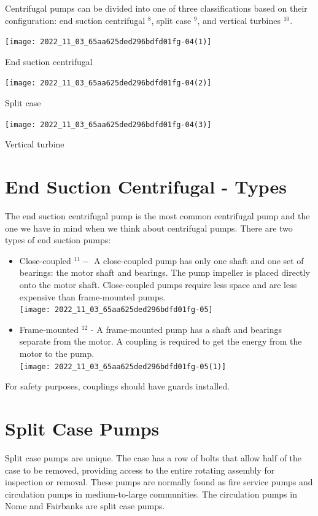 \documentclass[10pt]{article}
\begin{document}
Centrifugal pumps can be divided into one of three classifications based on their configuration: end suction centrifugal ${ }^{8}$, split case $^{9}$, and vertical turbines ${ }^{10}$.

\texttt{[image: 2022\_11\_03\_65aa625ded296bdfd01fg-04(1)]}

End suction centrifugal

\texttt{[image: 2022\_11\_03\_65aa625ded296bdfd01fg-04(2)]}

Split case

\texttt{[image: 2022\_11\_03\_65aa625ded296bdfd01fg-04(3)]}

Vertical turbine

\section{End Suction Centrifugal - Types}
The end suction centrifugal pump is the most common centrifugal pump and the one we have in mind when we think about centrifugal pumps. There are two types of end suction pumps:

\begin{itemize}
  \item Close-coupled ${ }^{11}-$ A close-coupled pump has only one shaft and one set of bearings: the motor shaft and bearings. The pump impeller is placed directly onto the motor shaft. Close-coupled pumps require less space and are less expensive than frame-mounted pumps.\\

\texttt{[image: 2022\_11\_03\_65aa625ded296bdfd01fg-05]}

  \item Frame-mounted ${ }^{12}$ - A frame-mounted pump has a shaft and bearings separate from the motor. A coupling is required to get the energy from the motor to the pump.\\

\texttt{[image: 2022\_11\_03\_65aa625ded296bdfd01fg-05(1)]}

\end{itemize}
For safety purposes, couplings should have guards installed.

\section{Split Case Pumps}
Split case pumps are unique. The case has a row of bolts that allow half of the case to be removed, providing access to the entire rotating assembly for inspection or removal. These pumps are normally found as fire service pumps and circulation pumps in medium-to-large communities. The circulation pumps in Nome and Fairbanks are split case pumps.
\end{document}
